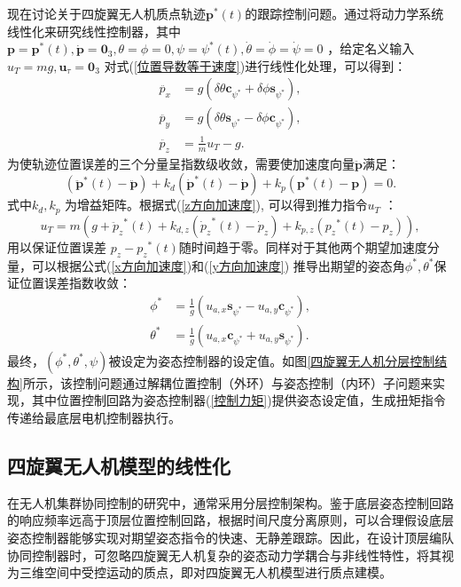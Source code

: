 现在讨论关于四旋翼无人机质点轨迹$\mathbf{p}^{*}(t)$的跟踪控制问题。通过将动力学系统线性化来研究线性控制器，其中 $ \mathbf{p} = \mathbf{p}^{*}(t) , \dot{\mathbf{p}} = \mathbf{0}_3, \theta = \phi = 0, \psi = \psi^*(t) , \dot{\theta} = \dot{\phi} = \dot{\psi} = 0$ ，给定名义输入$ u_T = mg , \mathbf{u}_\tau = \mathbf{0}_3$ 对式(\ref{位置导数等于速度})进行线性化处理，可以得到：
\begin{align}
	\ddot{p_x} &= g(\delta\theta \mathbf{c}_{\psi^*} + \delta\phi \mathbf{s}_{\psi^*})\label{x方向加速度}, \\ 
	\ddot{p_y} &= g(\delta\theta \mathbf{s}_{\psi^*} - \delta\phi \mathbf{c}_{\psi^*})\label{y方向加速度}, \\ 
	\ddot{p_z} &= \frac{1}{m} u_T - g \label{z方向加速度}. 
\end{align}
为使轨迹位置误差的三个分量呈指数级收敛，需要使加速度向量$ \ddot{\mathbf{p}} $满足：
\begin{equation}
	(\ddot{\mathbf{p}}^{*}(t) - \ddot{\mathbf{p}}) + 
	k_d (\dot{\mathbf{p}}^{*}(t) - \dot{\mathbf{p}}) + 
	k_p ({\mathbf{p}^{*}(t)} - {\mathbf{p}}) = 0 .
\end{equation}
式中$ k_d, k_p$ 为增益矩阵。根据式(\ref{z方向加速度}), 可以得到推力指令$u_T$ ：
\begin{equation}
	u_T = m(g + {\ddot{p}_z}^*(t) + 
	k_{d,z} ( {\dot{p}_z}^*(t) - {\dot{p}_z}) + 
	k_{p,z} ({p_z}^*(t) - p_z)   ),
\end{equation}
用以保证位置误差 $ {{p}_z}-{{p}_z}^*(t) $随时间趋于零。同样对于其他两个期望加速度分量，可以根据公式(\ref{x方向加速度})和(\ref{y方向加速度}) 推导出期望的姿态角$ \phi^*,\theta^* $保证位置误差指数收敛：
\begin{align}
	\phi^* &= \frac{1}{g} (u_{a,x} \mathbf{s}_{\psi^*} - u_{a,y} \mathbf{c}_{\psi^*}) , \\
	\theta^* &= \frac{1}{g} (u_{a,x} \mathbf{c}_{\psi^*} + u_{a,y} \mathbf{s}_{\psi^*}) .
\end{align}
最终，$ (\phi^*, \theta^*, \psi) $被设定为姿态控制器的设定值。如图\ref{四旋翼无人机分层控制结构}所示，该控制问题通过解耦位置控制（外环）与姿态控制（内环）子问题来实现，其中位置控制回路为姿态控制器(\ref{控制力矩})提供姿态设定值，生成扭矩指令传递给最底层电机控制器执行。


\subsection{四旋翼无人机模型的线性化}

在无人机集群协同控制的研究中，通常采用分层控制架构。鉴于底层姿态控制回路的响应频率远高于顶层位置控制回路，根据时间尺度分离原则，可以合理假设底层姿态控制器能够实现对期望姿态指令的快速、无静差跟踪。因此，在设计顶层编队协同控制器时，可忽略四旋翼无人机复杂的姿态动力学耦合与非线性特性，将其视为三维空间中受控运动的质点，即对四旋翼无人机模型进行质点建模。

